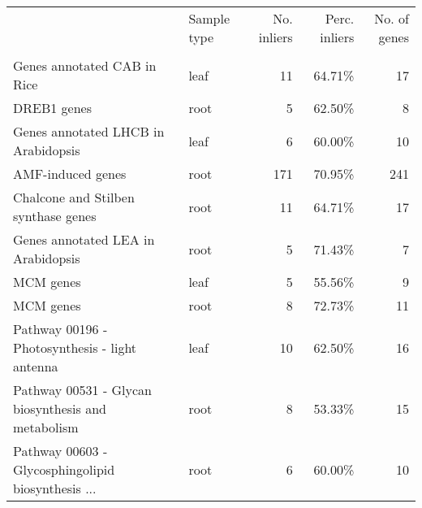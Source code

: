 \begin{tabular}{llrrr}
\toprule
{} & Sample type &  No. inliers &  Perc. inliers &  No. of genes \\
                                                   &             &              &                &               \\
\midrule
Genes annotated CAB in Rice                        &        leaf &           11 &         64.71\% &            17 \\
DREB1 genes                                        &        root &            5 &         62.50\% &             8 \\
Genes annotated LHCB in Arabidopsis                &        leaf &            6 &         60.00\% &            10 \\
AMF-induced genes                                  &        root &          171 &         70.95\% &           241 \\
Chalcone and Stilben synthase genes                &        root &           11 &         64.71\% &            17 \\
Genes annotated LEA in Arabidopsis                 &        root &            5 &         71.43\% &             7 \\
MCM genes                                          &        leaf &            5 &         55.56\% &             9 \\
MCM genes                                          &        root &            8 &         72.73\% &            11 \\
Pathway 00196 - Photosynthesis - light antenna     &        leaf &           10 &         62.50\% &            16 \\
Pathway 00531 - Glycan biosynthesis and metabolism &        root &            8 &         53.33\% &            15 \\
Pathway 00603 - Glycosphingolipid biosynthesis ... &        root &            6 &         60.00\% &            10 \\
\bottomrule
\end{tabular}
